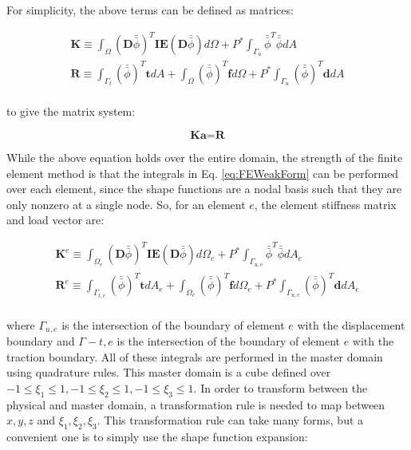 \documentclass[10pt]{article}
\begin{document}
For simplicity, the above terms can be defined as matrices:

\begin{equation}
\label{eq:FEWeakForm}
\begin{aligned}
\textbf{K}\equiv\int_{\Omega}(\textbf{D}\bar{\bar{\phi}})^T\textbf{IE}(\textbf{D}\bar{\bar{\phi}})d\Omega +P^{*}\int_{\Gamma_u}\bar{\bar{\phi}}^T\bar{\bar{\phi}}dA\\
\textbf{R}\equiv\int_{\Gamma_t}(\bar{\bar{\phi}})^T\textbf{t}dA+\int_{\Omega}(\bar{\bar{\phi}})^T\textbf{f}d\Omega+P^{*}\int_{\Gamma_u}(\bar{\bar{\phi}})^T\textbf{d}dA\\
\end{aligned}
\end{equation}

to give the matrix system:

\begin{equation}
\textbf{K}\textbf{a}=\textbf{R}
\end{equation}

While the above equation holds over the entire domain, the strength of the finite element method is that the integrals in Eq. \eqref{eq:FEWeakForm} can be performed over each element, since the shape functions are a nodal basis such that they are only nonzero at a single node. So, for an element \(e\), the element stiffness matrix and load vector are:

\begin{equation}
\label{eq:FEWeakForm_element}
\begin{aligned}
\textbf{K}^e\equiv\int_{\Omega_e}(\textbf{D}\bar{\bar{\phi}})^T\textbf{IE}(\textbf{D}\bar{\bar{\phi}})d\Omega_e +P^{*}\int_{\Gamma_{u,e}}\bar{\bar{\phi}}^T\bar{\bar{\phi}}dA_e\\
\textbf{R}^e\equiv\int_{\Gamma_{t,e}}(\bar{\bar{\phi}})^T\textbf{t}dA_e+\int_{\Omega_e}(\bar{\bar{\phi}})^T\textbf{f}d\Omega_e+P^{*}\int_{\Gamma_{u,e}}(\bar{\bar{\phi}})^T\textbf{d}dA_e\\
\end{aligned}
\end{equation}

where \(\Gamma_{u,e}\) is the intersection of the boundary of element \(e\) with the displacement boundary and \(\Gamma-{t,e}\) is the intersection of the boundary of element \(e\) with the traction boundary. All of these integrals are performed in the master domain using quadrature rules. This master domain is a cube defined over \(-1\leq\xi_1\leq1, -1\leq\xi_2\leq1, -1\leq\xi_3\leq1\). In order to transform between the physical and master domain, a transformation rule is needed to map between \(x,y,z\) and \(\xi_1,\xi_2,\xi_3\). This transformation rule can take many forms, but a convenient one is to simply use the shape function expansion:
\end{document}
